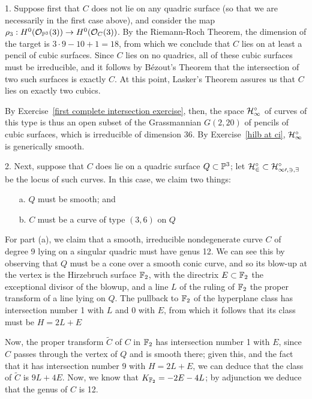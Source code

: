 1. Suppose first that $C$ does not lie on any quadric surface (so that we are necessarily in the first case above), and consider the map $\rho_3 : H^0({\mathcal O}_{{\mathbb P}^3}(3)) \to H^0({\mathcal O}_C(3))$. By the Riemann-Roch Theorem, the dimension of the target is $3\cdot 9 - 10 + 1 = 18$, from which we conclude that $C$ lies on at least a pencil of cubic surfaces. Since $C$ lies on no quadrics, all of these cubic surfaces must be irreducible, and it follows by B\'ezout's Theorem that the intersection of two such surfaces is exactly $C$. At this point, Lasker's Theorem assures us that $C$ lies on exactly two cubics.

By Exercise~\ref{first complete intersection exercise}, then, the space $\cal H^\circ_1$ of curves of this type is thus an open subset of the Grassmannian $G(2,20)$ of pencils of cubic surfaces, which is irreducible of dimension 36. By Exercise~\ref{hilb at ci}, $\cal H^\circ_1$ is generically smooth.

2. Next, suppose that $C$ does lie on a quadric surface $Q \subset {\mathbb P}^3$; let $\cal H^\circ_2 \subset \cal H^\circ_{10,3,9}$ be the locus of such curves. In this case, we claim two things:
\begin{enumerate}
\item[a.] $Q$ must be smooth; and
\item[b.] $C$ must be a curve of type $(3,6)$ on $Q$
\end{enumerate}

For part (a), we claim that a smooth, irreducible nondegenerate curve $C$ of degree 9 lying on a singular quadric must have genus 12. We can see this by observing that $Q$ must be a cone over a smooth conic curve, and so its blow-up at the vertex is the Hirzebruch surface ${\mathbb F}_2$, with the directrix $E \subset {\mathbb F}_2$ the exceptional divisor of the blowup, and a line $L$ of the ruling of ${\mathbb F}_2$ the proper transform of a line lying on $Q$. The pullback to ${\mathbb F}_2$ of the hyperplane class has intersection number 1 with $L$ and 0 with $E$, from which it follows that its class must  be $H = 2L + E$

Now, the proper transform $\widetilde C$ of $C$ in ${\mathbb F}_2$ has intersection number 1 with $E$, since $C$ passes through the vertex of $Q$ and is smooth there; given this, and the fact that it has intersection number 9 with $H = 2L+E$, we can deduce that the class of $\widetilde C$ is $9L + 4E$. Now, we know that $K_{{\mathbb F}_2} = -2E - 4L$; by adjunction we deduce that  the genus of $C$ is 12.

